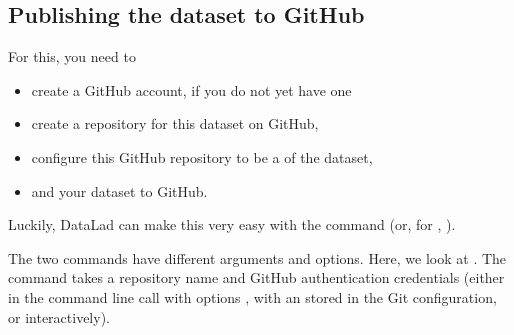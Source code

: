 \ignorespaces 

\subsection{Publishing the dataset to GitHub}
\label{\detokenize{basics/101-130-yodaproject:publishing-the-dataset-to-github}}\label{\detokenize{basics/101-130-yodaproject:publishtogithub}}\label{\detokenize{basics/101-130-yodaproject:index-11}}
\sphinxAtStartPar
For this, you need to
\begin{itemize}
\item {} 
\sphinxAtStartPar
create a GitHub account, if you do not yet have one

\item {} 
\sphinxAtStartPar
create a repository for this dataset on GitHub,

\item {} 
\sphinxAtStartPar
configure this GitHub repository to be a {\hyperref[\detokenize{glossary:term-sibling}]{}} of the  dataset,

\item {} 
\sphinxAtStartPar
and  your dataset to GitHub.

\end{itemize}

\ignorespaces 
\sphinxAtStartPar
Luckily, DataLad can make this very easy with the
command (or, for , ).

\sphinxAtStartPar
The two commands have different arguments and options.
Here, we look at .
The command takes a repository name and GitHub authentication credentials
(either in the command line call with options , with an   stored in the Git
configuration, or interactively).

